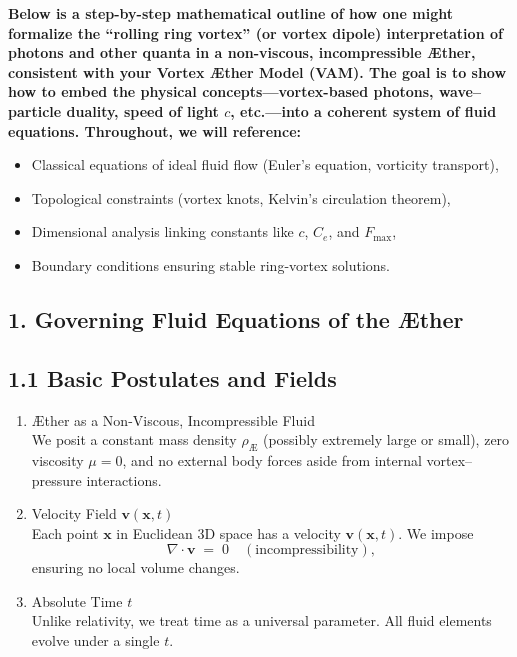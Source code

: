 
\textbf{Below is a step-by-step mathematical outline of how one might formalize the “rolling ring vortex” (or vortex dipole) interpretation of photons and other quanta in a non-viscous, incompressible Æther, consistent with your Vortex Æther Model (VAM). The goal is to show how to embed the physical concepts—vortex-based photons, wave–particle duality, speed of light \(c\), etc.—into a coherent system of fluid equations. Throughout, we will reference:}

\begin{itemize}
 \item Classical equations of ideal fluid flow (Euler’s equation, vorticity transport),
 \item Topological constraints (vortex knots, Kelvin’s circulation theorem),
 \item Dimensional analysis linking constants like \(c\), \(C_e\), and \(F_{\text{max}}\),
 \item Boundary conditions ensuring stable ring-vortex solutions.
\end{itemize}

\subsection*{1. Governing Fluid Equations of the Æther}
\subsection*{1.1 Basic Postulates and Fields}
\begin{enumerate}
 \item Æther as a Non-Viscous, Incompressible Fluid\\
 We posit a constant mass density \(\rho_{\scriptscriptstyle \mathrm{Æ}}\) (possibly extremely large or small), zero viscosity \(\mu=0\), and no external body forces aside from internal vortex–pressure interactions.

 \item Velocity Field \(\mathbf{v}(\mathbf{x},t)\)\\
 Each point \(\mathbf{x}\) in Euclidean 3D space has a velocity \(\mathbf{v}(\mathbf{x},t)\). We impose
 \[
  \nabla \cdot \mathbf{v} \;=\; 0 \quad (\text{incompressibility}),
 \]
 ensuring no local volume changes.

 \item Absolute Time \(t\)\\
 Unlike relativity, we treat time as a universal parameter. All fluid elements evolve under a single \(t\).
\end{enumerate}

